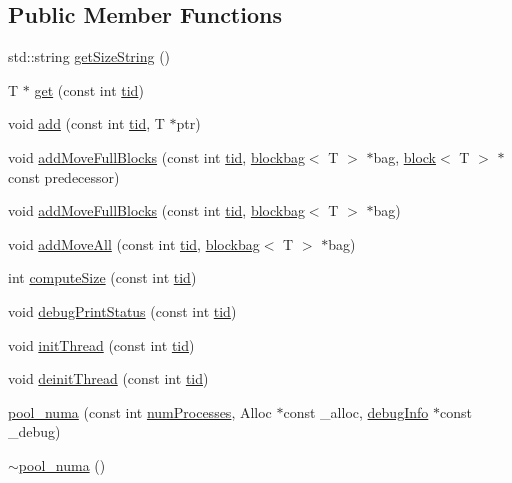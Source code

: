 \subsection*{Public Member Functions}
\begin{DoxyCompactItemize}
\item 
std\+::string \hyperlink{classpool__numa_ab2ef3aa401ebf9cf6577e1a583fcc157}{get\+Size\+String} ()
\item 
T $\ast$ \hyperlink{classpool__numa_ada7ec291f407081e3c597635fc20ee69}{get} (const int \hyperlink{microbench_2main_8cpp_a9ca9869868fe7e7a38a921cc7de4103f}{tid})
\item 
void \hyperlink{classpool__numa_a0ffdd17b3201916fe7a7eabef807c1e0}{add} (const int \hyperlink{microbench_2main_8cpp_a9ca9869868fe7e7a38a921cc7de4103f}{tid}, T $\ast$ptr)
\item 
void \hyperlink{classpool__numa_a3d31aedd219ebb03bedb25cd375781e8}{add\+Move\+Full\+Blocks} (const int \hyperlink{microbench_2main_8cpp_a9ca9869868fe7e7a38a921cc7de4103f}{tid}, \hyperlink{classblockbag}{blockbag}$<$ T $>$ $\ast$bag, \hyperlink{classblock}{block}$<$ T $>$ $\ast$const predecessor)
\item 
void \hyperlink{classpool__numa_aa6eb3d3d60e8da2ea2ef0adc499e5921}{add\+Move\+Full\+Blocks} (const int \hyperlink{microbench_2main_8cpp_a9ca9869868fe7e7a38a921cc7de4103f}{tid}, \hyperlink{classblockbag}{blockbag}$<$ T $>$ $\ast$bag)
\item 
void \hyperlink{classpool__numa_afa864cb84a8d1e5b5bae1745d0ef36bc}{add\+Move\+All} (const int \hyperlink{microbench_2main_8cpp_a9ca9869868fe7e7a38a921cc7de4103f}{tid}, \hyperlink{classblockbag}{blockbag}$<$ T $>$ $\ast$bag)
\item 
int \hyperlink{classpool__numa_a192004323f02fb5713a08bf24ebdc11f}{compute\+Size} (const int \hyperlink{microbench_2main_8cpp_a9ca9869868fe7e7a38a921cc7de4103f}{tid})
\item 
void \hyperlink{classpool__numa_a9acd9ed86c56c4a2edf2b260cfaeb396}{debug\+Print\+Status} (const int \hyperlink{microbench_2main_8cpp_a9ca9869868fe7e7a38a921cc7de4103f}{tid})
\item 
void \hyperlink{classpool__numa_a1066d0f94458e2080802e87627699841}{init\+Thread} (const int \hyperlink{microbench_2main_8cpp_a9ca9869868fe7e7a38a921cc7de4103f}{tid})
\item 
void \hyperlink{classpool__numa_a10496f39e8c23755147d90c3b57618fa}{deinit\+Thread} (const int \hyperlink{microbench_2main_8cpp_a9ca9869868fe7e7a38a921cc7de4103f}{tid})
\item 
\hyperlink{classpool__numa_aaa2884448972f582e0f9428027a35d97}{pool\+\_\+numa} (const int \hyperlink{testing_8cpp_aa085812188e21ede75351d88b9b2c30d}{num\+Processes}, Alloc $\ast$const \+\_\+alloc, \hyperlink{classdebugInfo}{debug\+Info} $\ast$const \+\_\+debug)
\item 
\hyperlink{classpool__numa_a8e29fd88094bb876fcb02a59f6dd0f0a}{$\sim$pool\+\_\+numa} ()
\end{DoxyCompactItemize}
